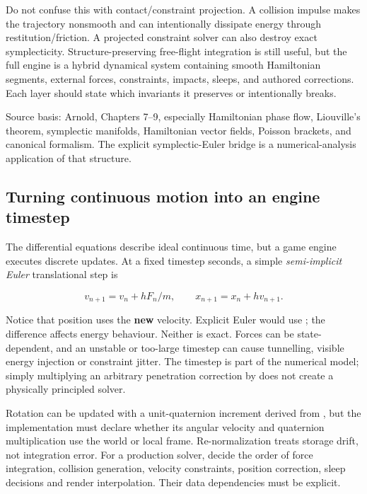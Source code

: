 Do not confuse this with contact/constraint projection. A collision impulse makes the trajectory nonsmooth and can intentionally dissipate energy through restitution/friction. A projected constraint solver can also destroy exact symplecticity. Structure-preserving free-flight integration is still useful, but the full engine is a hybrid dynamical system containing smooth Hamiltonian segments, external forces, constraints, impacts, sleeps, and authored corrections. Each layer should state which invariants it preserves or intentionally breaks.

Source basis: Arnold, Chapters 7--9, especially Hamiltonian phase flow, Liouville's theorem, symplectic manifolds, Hamiltonian vector fields, Poisson brackets, and canonical formalism. The explicit symplectic-Euler bridge is a numerical-analysis application of that structure.

\subsection{Turning continuous motion into an engine timestep}\label{02-foundations-ii-ch039-turning-continuous-motion-into-an-engine-timestep}

\hypertarget{02-foundations-ii-ch039-turning-continuous-motion-into-an-engine-timestep}{}

The differential equations describe ideal continuous time, but a game engine executes discrete updates. At a fixed timestep  seconds, a simple \emph{semi-implicit Euler} translational step is

\[
v_{n+1}=v_n+h F_n/m,\qquad x_{n+1}=x_n+h v_{n+1}.
\]

Notice that position uses the \textbf{new} velocity. Explicit Euler would use ; the difference affects energy behaviour. Neither is exact. Forces can be state-dependent, and an unstable or too-large timestep can cause tunnelling, visible energy injection or constraint jitter. The timestep is part of the numerical model; simply multiplying an arbitrary penetration correction by  does not create a physically principled solver.

Rotation can be updated with a unit-quaternion increment derived from , but the implementation must declare whether its angular velocity and quaternion multiplication use the world or local frame. Re-normalization treats storage drift, not integration error. For a production solver, decide the order of force integration, collision generation, velocity constraints, position correction, sleep decisions and render interpolation. Their data dependencies must be explicit.

